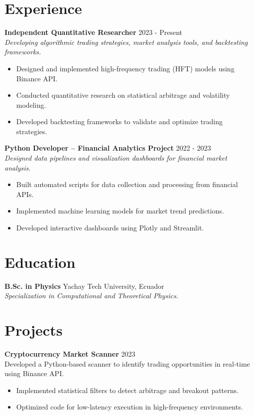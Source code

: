 \documentclass{article}
\begin{document}
\section*{Experience}
\textbf{Independent Quantitative Researcher} \hfill 2023 - Present \\
\textit{Developing algorithmic trading strategies, market analysis tools, and backtesting frameworks.}
\begin{itemize}
    \item Designed and implemented high-frequency trading (HFT) models using Binance API.
    \item Conducted quantitative research on statistical arbitrage and volatility modeling.
    \item Developed backtesting frameworks to validate and optimize trading strategies.
\end{itemize}

\textbf{Python Developer – Financial Analytics Project} \hfill 2022 - 2023 \\
\textit{Designed data pipelines and visualization dashboards for financial market analysis.}
\begin{itemize}
    \item Built automated scripts for data collection and processing from financial APIs.
    \item Implemented machine learning models for market trend predictions.
    \item Developed interactive dashboards using Plotly and Streamlit.
\end{itemize}

\section*{Education}
\textbf{B.Sc. in Physics} \hfill Yachay Tech University, Ecuador \\
\textit{Specialization in Computational and Theoretical Physics.}

\section*{Projects}
\textbf{Cryptocurrency Market Scanner} \hfill 2023 \\
Developed a Python-based scanner to identify trading opportunities in real-time using Binance API.
\begin{itemize}
    \item Implemented statistical filters to detect arbitrage and breakout patterns.
    \item Optimized code for low-latency execution in high-frequency environments.
\end{itemize}
\end{document}
